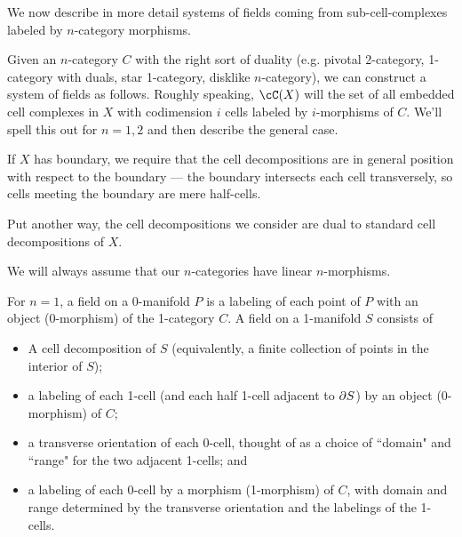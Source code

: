 \documentclass[11pt,leqno]{amsart}
\begin{document}

%
%
%
%



We now describe in more detail systems of fields coming from sub-cell-complexes labeled
by $n$-category morphisms.

Given an $n$-category $C$ with the right sort of duality
(e.g. pivotal 2-category, 1-category with duals, star 1-category, disklike $n$-category),
we can construct a system of fields as follows.
Roughly speaking, $\cC(X)$ will the set of all embedded cell complexes in $X$
with codimension $i$ cells labeled by $i$-morphisms of $C$.
We'll spell this out for $n=1,2$ and then describe the general case.

If $X$ has boundary, we require that the cell decompositions are in general
position with respect to the boundary --- the boundary intersects each cell
transversely, so cells meeting the boundary are mere half-cells.

Put another way, the cell decompositions we consider are dual to standard cell
decompositions of $X$.

We will always assume that our $n$-categories have linear $n$-morphisms.

For $n=1$, a field on a 0-manifold $P$ is a labeling of each point of $P$ with
an object (0-morphism) of the 1-category $C$.
A field on a 1-manifold $S$ consists of
\begin{itemize}
    \item A cell decomposition of $S$ (equivalently, a finite collection
of points in the interior of $S$);
    \item a labeling of each 1-cell (and each half 1-cell adjacent to $\partial S$)
by an object (0-morphism) of $C$;
    \item a transverse orientation of each 0-cell, thought of as a choice of
``domain" and ``range" for the two adjacent 1-cells; and
    \item a labeling of each 0-cell by a morphism (1-morphism) of $C$, with
domain and range determined by the transverse orientation and the labelings of the 1-cells.
\end{itemize}
\end{document}
